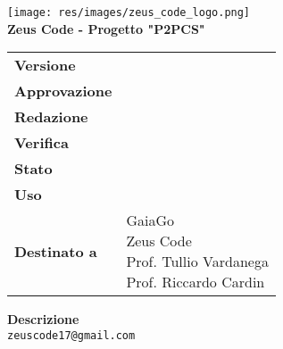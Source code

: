 \thispagestyle{empty}
\begin{titlepage}
	\begin{center}
		\texttt{[image: res/images/zeus\_code\_logo.png]}\\
		\large \textbf{Zeus Code - Progetto "P2PCS"} \\
		\vfill
		\Huge \textbf{\doctitle}
		\vspace*{\fill}
		
		\vfill
		\large
	\end{center}
	\begin{table}[htbp]
		\centering
		\hspace*{2cm}
		\begin{tabular}{l|l}
			\textbf{Versione} & \rev{} \\
			\textbf{Approvazione} & \approv{} \\
			\textbf{Redazione} & \red{} \\
			\textbf{Verifica} & \ver{} \\
			\textbf{Stato} & \stato{} \\
			\textbf{Uso} & \uso{} \\
			\textbf{Destinato a} & \parbox[t]{5cm}{GaiaGo \\Zeus Code
				\\Prof. Tullio Vardanega\\Prof. Riccardo Cardin}
		\end{tabular}
	\end{table}
	\begin{center}
		\vfill
		\normalsize
		\textbf{Descrizione}\\
		\describedoc
		\vfill
		\small
		\texttt{zeuscode17@gmail.com}
	\end{center}
\end{titlepage}
